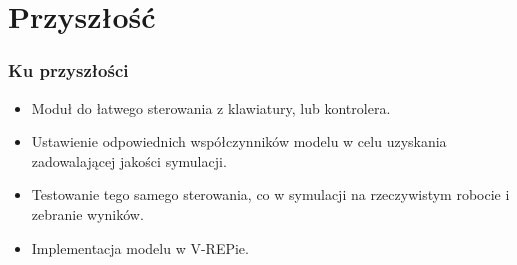 \documentclass{beamer}
\begin{document}
	\section{Przyszłość}
	\begin{frame}
		\frametitle{Ku przyszłości}
		\begin{itemize}
			\item Moduł do łatwego sterowania z klawiatury, lub kontrolera.
			\item Ustawienie odpowiednich współczynników modelu w celu uzyskania zadowalającej jakości symulacji.
			\item Testowanie tego samego sterowania, co w symulacji na rzeczywistym robocie i zebranie wyników.
			\item Implementacja modelu w V-REPie. 
		\end{itemize}
	\end{frame}
\end{document}
